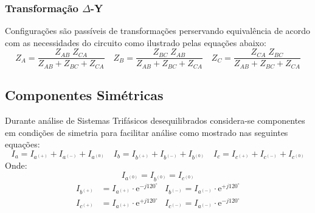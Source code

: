 \documentclass{article}
\begin{document}
    \subsubsection{Transformação $\Delta$-Y}
        \begin{definition}
            Configurações são passíveis de transformações perservando equivalência de acordo com as necessidades do circuito como ilustrado pelas equações abaixo:
                \begin{equation}
                    \boxed{Z_{A} = \frac{Z_{AB}\;Z_{CA}}{Z_{AB} + Z_{BC} + Z_{CA}}}
                    \quad
                    \boxed{Z_{B} = \frac{Z_{BC}\;Z_{AB}}{Z_{AB} + Z_{BC} + Z_{CA}}}
                    \quad
                    \boxed{Z_{C} = \frac{Z_{CA}\;Z_{BC}}{Z_{AB} + Z_{BC} + Z_{CA}}}
                \end{equation}
        \end{definition}

\subsection{Componentes Simétricas}
    \begin{definition}
        Durante análise de Sistemas Trifásicos desequilibrados considera-se componentes em condições de simetria para facilitar análise como mostrado nas seguintes equações:
            \begin{equation}
                \boxed{I_{a} = I_{a^{(+)}} + I_{a^{(-)}} + I_{a^{(0)}}}
                \quad
                \boxed{I_{b} = I_{b^{(+)}} + I_{b^{(-)}} + I_{b^{(0)}}}
                \quad
                \boxed{I_{c} = I_{c^{(+)}} + I_{c^{(-)}} + I_{c^{(0)}}}
            \end{equation}
        Onde:
            \begin{equation*}
                I_{a^{(0)}} = I_{b^{(0)}} = I_{c^{(0)}}
            \end{equation*}
            \begin{align}
                I_{b^{(+)}} &= I_{a^{(+)}}\cdot\text{e}^{-j120^{\circ}} & I_{b^{(-)}} = I_{a^{(-)}}\cdot\text{e}^{+j120^{\circ}}\nonumber\\
                I_{c^{(+)}} &= I_{a^{(+)}}\cdot\text{e}^{+j120^{\circ}} & I_{c^{(-)}} = I_{a^{(-)}}\cdot\text{e}^{-j120^{\circ}}\nonumber
            \end{align}
    \end{definition}
\end{document}

